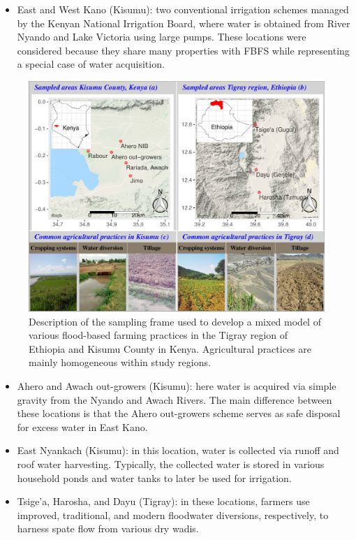 \documentclass[]{elsarticle} %
\providecommand{\tightlist}{%
  \setlength{\itemsep}{0pt}\setlength{\parskip}{0pt}}
\begin{document}
\begin{itemize}
\tightlist
\item
  East and West Kano (Kisumu): two conventional irrigation schemes managed by the Kenyan National Irrigation Board, where water is obtained from River Nyando and Lake Victoria using large pumps. These locations were considered because they share many properties with FBFS while representing a special case of water acquisition.
\end{itemize}

\begin{figure}[!h]

{\centering \includegraphics[width=1\linewidth,]{figures/Modelling_FBFS_study_area} 

}

\caption{Description of the sampling frame used to develop a mixed model of various flood-based farming practices in the Tigray region of Ethiopia and Kisumu County in Kenya. Agricultural practices are mainly homogeneous within study regions.}\label{fig:fig1}
\end{figure}

\begin{itemize}
\item
  Ahero and Awach out-growers (Kisumu): here water is acquired via simple gravity from the Nyando and Awach Rivers. The main difference between these locations is that the Ahero out-growers scheme serves as safe disposal for excess water in East Kano.
\item
  East Nyankach (Kisumu): in this location, water is collected via runoff and roof water harvesting. Typically, the collected water is stored in various household ponds and water tanks to later be used for irrigation.
\item
  Tsige'a, Harosha, and Dayu (Tigray): in these locations, farmers use improved, traditional, and modern floodwater diversions, respectively, to harness spate flow from various dry wadis.
\end{itemize}
\end{document}
